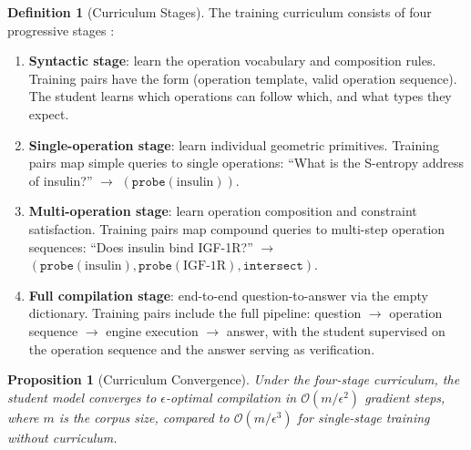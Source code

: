 \documentclass[11pt,twocolumn,a4paper]{article}
\newtheorem{proposition}[theorem]{Proposition}
\theoremstyle{definition}
\newtheorem{definition}[theorem]{Definition}
\theoremstyle{remark}
\begin{document}
\begin{definition}[Curriculum Stages]
\label{def:curriculum}
The training curriculum consists of four progressive stages \citep{bengio2009}:
\begin{enumerate}
    \item \textbf{Syntactic stage}: learn the operation vocabulary and composition rules. Training pairs have the form (operation template, valid operation sequence). The student learns which operations can follow which, and what types they expect.

    \item \textbf{Single-operation stage}: learn individual geometric primitives. Training pairs map simple queries to single operations: ``What is the S-entropy address of insulin?'' $\to$ $(\texttt{probe}(\text{insulin}))$.

    \item \textbf{Multi-operation stage}: learn operation composition and constraint satisfaction. Training pairs map compound queries to multi-step operation sequences: ``Does insulin bind IGF-1R?'' $\to$ $(\texttt{probe}(\text{insulin}), \texttt{probe}(\text{IGF-1R}), \texttt{intersect})$.

    \item \textbf{Full compilation stage}: end-to-end question-to-answer via the empty dictionary. Training pairs include the full pipeline: question $\to$ operation sequence $\to$ engine execution $\to$ answer, with the student supervised on the operation sequence and the answer serving as verification.
\end{enumerate}
\end{definition}

\begin{proposition}[Curriculum Convergence]
\label{prop:curriculum}
Under the four-stage curriculum, the student model converges to $\epsilon$-optimal compilation in $\mathcal{O}(m / \epsilon^2)$ gradient steps, where $m$ is the corpus size, compared to $\mathcal{O}(m / \epsilon^3)$ for single-stage training without curriculum.
\end{proposition}
\end{document}
